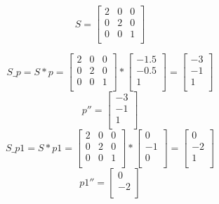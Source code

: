 \documentclass{article}
\begin{document}
\[
    S =
    \begin{bmatrix}
        2 & 0 & 0 \\
        0 & 2 & 0 \\
        0 & 0 & 1 \\
    \end{bmatrix}
\]



\[
    S\_p = S * p =
    \begin{bmatrix}
        2 & 0 & 0 \\
        0 & 2 & 0 \\
        0 & 0 & 1 \\
    \end{bmatrix}
    *
    \begin{bmatrix}
        -1.5 \\
        -0.5 \\
        1    \\
    \end{bmatrix}
    =
    \begin{bmatrix}
        -3 \\
        -1 \\
        1  \\
    \end{bmatrix}
\]
\[
    p'' =
    \begin{bmatrix}
        -3 \\
        -1 \\
        1  \\
    \end{bmatrix}
\]
\[
    S\_p1 = S * p1 =
    \begin{bmatrix}
        2 & 0 & 0 \\
        0 & 2 & 0 \\
        0 & 0 & 1 \\
    \end{bmatrix}
    *
    \begin{bmatrix}
        0  \\
        -1 \\
        0  \\
    \end{bmatrix}
    =
    \begin{bmatrix}
        0  \\
        -2 \\
        1  \\
    \end{bmatrix}
\]
\[
    p1'' =
    \begin{bmatrix}
        0  \\
        -2 \\
    \end{bmatrix}
\]
\end{document}
